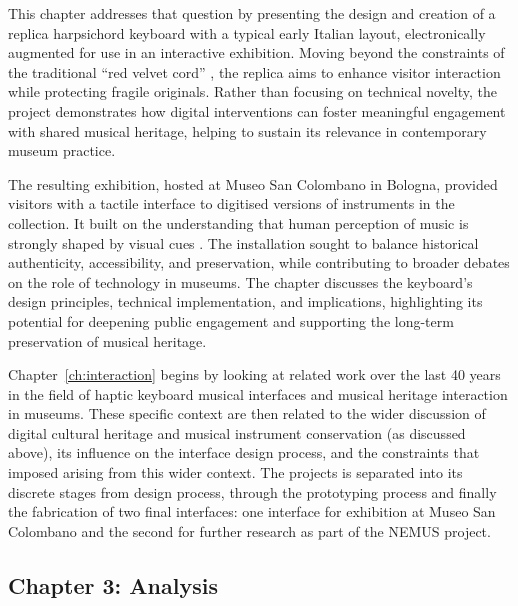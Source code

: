 This chapter addresses that question by presenting the design and creation of a
replica harpsichord keyboard with a typical early Italian layout, electronically
augmented for use in an interactive exhibition. Moving beyond the constraints of
the traditional “red velvet cord”
\cite{mcalpine_sampling_2014,masu_o-in-nime_2023}, the replica aims to enhance
visitor interaction while protecting fragile originals. Rather than focusing on
technical novelty, the project demonstrates how digital interventions can foster
meaningful engagement with shared musical heritage, helping to sustain its
relevance in contemporary museum practice.

The resulting exhibition, hosted at Museo San Colombano in Bologna, provided
visitors with a tactile interface to digitised versions of instruments in the
collection. It built on the understanding that human perception of music is
strongly shaped by visual cues
\cite{fritz_player_2012,fritz_soloist_2014,fritz_listener_2017,tsay_sight_2013}.
The installation sought to balance historical authenticity, accessibility, and
preservation, while contributing to broader debates on the role of technology in
museums. The chapter discusses the keyboard’s design principles, technical
implementation, and implications, highlighting its potential for deepening
public engagement and supporting the long-term preservation of musical heritage.

Chapter~\ref{ch:interaction} begins by looking at related work over the last 40
years in the field of haptic keyboard musical interfaces and musical heritage
interaction in museums. These specific context are then related to the wider
discussion of digital cultural heritage and musical instrument conservation (as
discussed above), its influence on the interface design process, and the
constraints that imposed arising from this wider context. The projects is
separated into its discrete stages from design process, through the prototyping
process and finally the fabrication of two final interfaces: one interface for
exhibition at Museo San Colombano and the second for further research as part of
the NEMUS project.   

\subsection{Chapter 3: Analysis}

